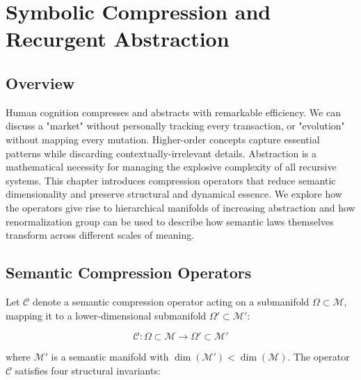 \chapter{Symbolic Compression and Recurgent Abstraction}

\section{Overview}

Human cognition compresses and abstracts with remarkable efficiency. We can discuss a "market" without personally tracking every transaction, or "evolution" without mapping every mutation. Higher-order concepts capture essential patterns while discarding contextually-irrelevant details. Abstraction is a mathematical necessity for managing the explosive complexity of all recursive systems. This chapter introduces compression operators that reduce semantic dimensionality and preserve structural and dynamical essence. We explore how the operators give rise to hierarchical manifolds of increasing abstraction and how renormalization group can be used to describe how semantic laws themselves transform across different scales of meaning.

\section{Semantic Compression Operators}

Let \(\mathcal{C}\) denote a semantic compression operator acting on a submanifold \(\Omega \subset \mathcal{M}\), mapping it to a lower-dimensional submanifold \(\Omega' \subset \mathcal{M}'\):

\begin{equation}
\mathcal{C}: \Omega \subset \mathcal{M} \longrightarrow \Omega' \subset \mathcal{M}'
\end{equation}

where \(\mathcal{M}'\) is a semantic manifold with \(\dim(\mathcal{M}') < \dim(\mathcal{M})\). The operator \(\mathcal{C}\) satisfies four structural invariants:

